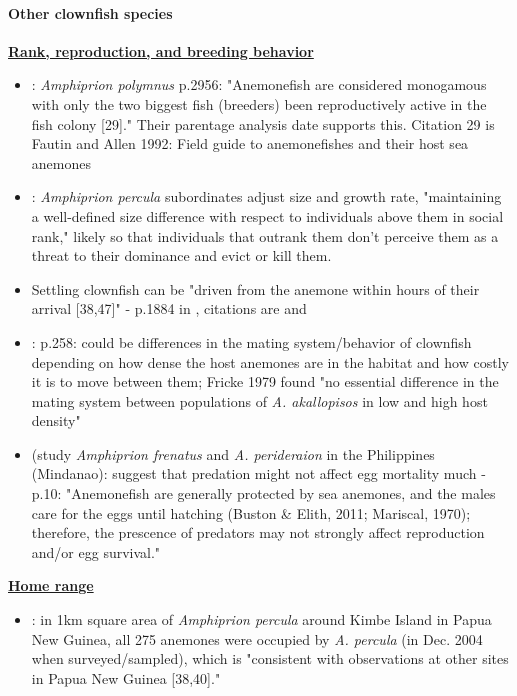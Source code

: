 \documentclass[12pt, oneside]{article}   	%
\begin{document}
\paragraph*{Other clownfish species}
\textbf{\underline{Rank, reproduction, and breeding behavior}}
\begin{itemize}
\item \cite{saenz2011connectivity}: \textit{Amphiprion polymnus} p.2956: "Anemonefish are considered monogamous with only the two biggest fish (breeders) been reproductively active in the fish colony [29]." Their parentage analysis date supports this. Citation 29 is Fautin and Allen 1992: Field guide to anemonefishes and their host sea anemones
\item \cite{buston2003social}: \textit{Amphiprion percula} subordinates adjust size and growth rate, "maintaining a well-defined size difference with respect to individuals above them in social rank," likely so that individuals that outrank them don't perceive them as a threat to their dominance and evict or kill them.
\item Settling clownfish can be "driven from the anemone within hours of their arrival [38,47]" - p.1884 in \cite{buston2011probability}, citations are \cite{buston2003forcible} and \cite{elliott1995host}
\item \cite{ochi1989mating}: p.258: could be differences in the mating system/behavior of clownfish depending on how dense the host anemones are in the habitat and how costly it is to move between them; Fricke 1979 found "no essential difference in the mating system between populations of \textit{A. akallopisos} in low and high host density"
\item \cite{sato2017marine} (study \textit{Amphiprion frenatus} and \textit{A. perideraion} in the Philippines (Mindanao): suggest that predation might not affect egg mortality much - p.10: "Anemonefish are generally protected by sea anemones, and the males care for the eggs until hatching (Buston \& Elith, 2011; Mariscal, 1970); therefore, the prescence of predators may not strongly affect reproduction and/or egg survival."
\end{itemize}

\textbf{\underline{Home range}}
\begin{itemize}
\item \cite{buston2011probability}: in 1km square area of \textit{Amphiprion percula} around Kimbe Island in Papua New Guinea, all 275 anemones were occupied by \textit{A. percula} (in Dec. 2004 when surveyed/sampled), which is "consistent with observations at other sites in Papua New Guinea [38,40]."
\end{itemize}
\end{document}
